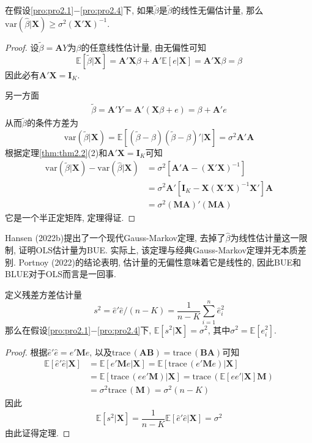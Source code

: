\documentclass[cn, 12pt, math=mtpro2, bibstyle=apa, blue, twocol]{elegantbook}
\newcommand{\E}{\mathbb{E}}
\newcommand{\var}{\text{var}}
\newcommand{\X}{\mathbold{X}}
\newcommand{\hb}{\hat{\beta}}
\newcommand{\M}{\mathbold{M}}
\begin{document}
\begin{theorem}\label{thm:thm2.7}
  在假设\ref{pro:pro2.1}$-$\ref{pro:pro2.4}下, 如果$\tilde{\beta}$是$\tilde{\beta}$的线性无偏估计量, 那么$\var(\hb|\X)\geq\sigma^2(\X'\X)^{-1}$.
\end{theorem}
\begin{proof}
  设$\tilde{\beta}=\mathbold{A}Y$为$\beta$的任意线性估计量, 由无偏性可知
  $$\E[\tilde{\beta}|\X]=\mathbold{A}'\X\beta+\mathbold{A}'\E[e|\X]=\mathbold{A}'\X\beta=\beta$$
  因此必有$\mathbold{A}'\X=\mathbold{I}_K$.

  另一方面
  \begin{align*}
  \tilde{\beta}=\mathbold{A}'Y=\mathbold{A}'(\X\beta+e)=\beta+\mathbold{A}'e
  \end{align*}
  从而$\tilde{\beta}$的条件方差为
  $$\var(\tilde{\beta}|\X)=\E[(\tilde{\beta}-\beta)(\tilde{\beta}-\beta)'|\X]=\sigma^2\mathbold{A}'\mathbold{A}$$
  根据定理\ref{thm:thm2.2}(2)和$\mathbold{A}'\X=\mathbold{I}_K$可知
  \begin{align*}
  \var(\tilde{\beta}|\X)-\var(\hb|\X)&=\sigma^2[\mathbold{A}'\mathbold{A}-(\X'\X)^{-1}] \\
  &=\sigma^2\mathbold{A}'[\mathbold{I}_K-\X(\X'\X)^{-1}\X']\mathbold{A} \\
  &=\sigma^2(\mathbold{MA})'(\mathbold{MA})
  \end{align*}
  它是一个半正定矩阵, 定理得证.
\end{proof}
\begin{remark}
Hansen (2022b)提出了一个现代Gauss-Markov定理, 去掉了$\hat{\beta}$为线性估计量这一限制, 证明OLS估计量为BUE. 实际上, 该定理与经典Gauss-Markov定理并无本质差别. Portnoy (2022)的结论表明, 估计量的无偏性意味着它是线性的, 因此BUE和BLUE对于OLS而言是一回事.
\end{remark}

\begin{theorem}\label{thm:thm2.4}
  定义残差方差估计量
  $$s^2=\hat{e}'\hat{e}/(n-K)=\frac{1}{n-K}\sum_{i=1}^{n}\hat{e}_i^2$$
  那么在假设\ref{pro:pro2.1}$-$\ref{pro:pro2.4}下, $\E[s^2|\X]=\sigma^2$, 其中$\sigma^2=\E[e_i^2]$.
\end{theorem}
\begin{proof}
  根据$\hat{e}'\hat{e}=e'\mathbold{M}e$, 以及$\text{trace}\,(\mathbold{AB})=\text{trace}\,(\mathbold{BA})$可知
  \begin{align*}
  \E[\hat{e}'\hat{e}|\X]&=\E[e'\mathbold{M}e|\X]=\E[\text{trace}\,(e'\M e)|\X] \\
  &=\E[\text{trace}\,(ee'\M)|\X]=\text{trace}\,(\E[ee'|\X]\M) \\
  &=\sigma^2\text{trace}\,(\M)=\sigma^2(n-K)
  \end{align*}
  因此
  $$\E[s^2|\X]=\frac{1}{n-K}\E[\hat{e}'\hat{e}|\X]=\sigma^2$$
  由此证得定理.
\end{proof}
\end{document}

